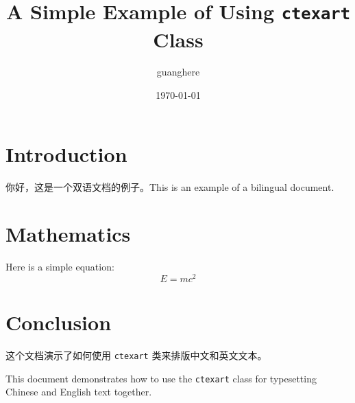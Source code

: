 \documentclass{ctexart}
\author{guanghere}
\title{A Simple Example of Using \texttt{ctexart} Class}
\date{\today}
\begin{document}
\maketitle
\section{Introduction}
你好，这是一个双语文档的例子。This is an example of a bilingual document.
\section{Mathematics}
Here is a simple equation:
\begin{equation}
E = mc^2
\end{equation}
\section{Conclusion}
这个文档演示了如何使用 \texttt{ctexart} 类来排版中文和英文文本。

This document demonstrates how to use the \texttt{ctexart} class for typesetting Chinese and English text together.
\end{document}
